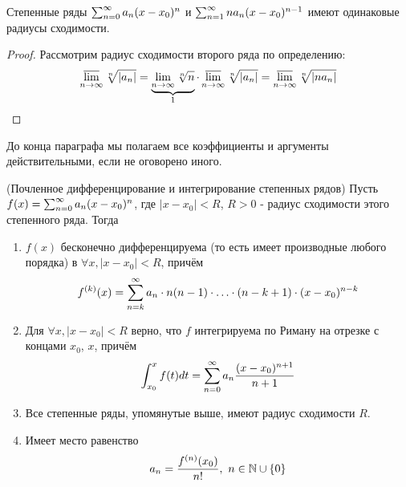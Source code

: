 \begin{lemma}
	Степенные ряды $\sum_{n = 0}^\infty a_n(x - x_0)^n$ и $\sum_{n = 1}^\infty na_n(x - x_0)^{n - 1}$ имеют одинаковые радиусы сходимости.
\end{lemma}

\begin{proof}
	Рассмотрим радиус сходимости второго ряда по определению:
	\[
		\varlimsup\limits_{n \to \infty} \sqrt[n]{|a_n|} = \underbrace{\lim\limits_{n \to \infty} \sqrt[n]{n}}_{1} \cdot \varlimsup\limits_{n \to \infty} \sqrt[n]{|a_n|} = \varlimsup\limits_{n \to \infty} \sqrt[n]{|na_n|}
	\]
\end{proof}

\begin{note}
	До конца параграфа мы полагаем все коэффициенты и аргументы действительными, если не оговорено иного.
\end{note}

\begin{theorem} (Почленное дифференцирование и интегрирование степенных рядов)
	Пусть $f(x) = \sum_{n = 0}^\infty a_n(x - x_0)^n$, где $|x - x_0| < R$, $R > 0$ - радиус сходимости этого степенного ряда. Тогда
	\begin{enumerate}
		\item $f(x)$ бесконечно дифференцируема (то есть имеет производные любого порядка) в $\forall x, |x - x_0| < R$, причём
		\[
			f^{(k)}(x) = \sum\limits_{n = k}^\infty a_n \cdot n(n - 1) \cdot \ldots \cdot (n - k + 1) \cdot (x - x_0)^{n - k}
		\]
		
		\item Для $\forall x, |x - x_0| < R$ верно, что $f$ интегрируема по Риману на отрезке с концами $x_0$, $x$, причём
		\[
			\int_{x_0}^x f(t)dt = \sum\limits_{n = 0}^\infty a_n \frac{(x - x_0)^{n + 1}}{n + 1}
		\]
		
		\item Все степенные ряды, упомянутые выше, имеют радиус сходимости $R$.
		
		\item Имеет место равенство
		\[
			a_n = \frac{f^{(n)}(x_0)}{n!},\ n \in \mathbb{N} \cup \{0\}
		\]
	\end{enumerate}
\end{theorem}

